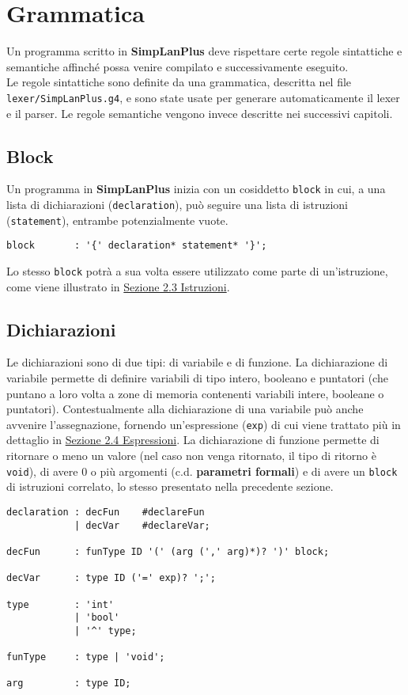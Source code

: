 \documentclass[../report.tex]{subfiles}
\begin{document}
\chapter{Grammatica}\label{c:grammatica}
Un programma scritto in \textbf{SimpLanPlus} deve rispettare certe regole sintattiche e semantiche affinché possa venire compilato e successivamente eseguito.\\
\noindent
Le regole sintattiche sono definite da una grammatica, descritta nel file \verb|lexer/SimpLanPlus.g4|, e sono state usate per generare automaticamente il lexer e il parser. Le regole semantiche vengono invece descritte nei successivi capitoli.

\section{Block}\label{s:block}
Un programma in \textbf{SimpLanPlus} inizia con un cosiddetto \verb|block| in cui, a una lista di dichiarazioni (\verb|declaration|), può seguire una lista di istruzioni (\verb|statement|), entrambe potenzialmente vuote.
\begin{lstlisting}[style=antlr]
block       : '{' declaration* statement* '}';
\end{lstlisting}
Lo stesso \verb|block| potrà a sua volta essere utilizzato come parte di un'istruzione, come viene illustrato in \hyperref[s:istruzioni]{Sezione 2.3 Istruzioni}.

\section{Dichiarazioni}\label{s:dichiarazioni}
Le dichiarazioni sono di due tipi: di variabile e di funzione. La dichiarazione di variabile permette di definire variabili di tipo intero, booleano e puntatori (che puntano a loro volta a zone di memoria contenenti variabili intere, booleane o puntatori). Contestualmente alla dichiarazione di una variabile può anche avvenire l'assegnazione, fornendo un'espressione (\verb|exp|) di cui viene trattato più in dettaglio in \hyperref[s:espressioni]{Sezione 2.4 Espressioni}.
La dichiarazione di funzione permette di ritornare o meno un valore (nel caso non venga ritornato, il tipo di ritorno è \verb|void|), di avere 0 o più argomenti (c.d. \textbf{parametri formali}) e di avere un \verb|block| di istruzioni correlato, lo stesso presentato nella precedente sezione.
\begin{lstlisting}[style=antlr]
declaration : decFun    #declareFun
            | decVar    #declareVar;

decFun      : funType ID '(' (arg (',' arg)*)? ')' block;

decVar      : type ID ('=' exp)? ';';

type        : 'int'
            | 'bool'
            | '^' type;

funType     : type | 'void';

arg         : type ID;
\end{lstlisting}
\end{document}
